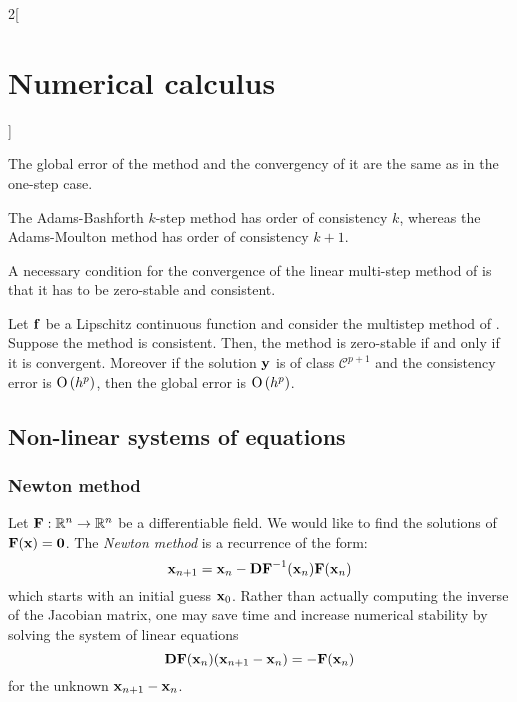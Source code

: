 \documentclass[../../../main_math.tex]{subfiles}
\begin{document}
\begin{multicols}{2}[\section{Numerical calculus}]
\begin{definition}
  \end{definition}
  \begin{remark}
    The global error of the method and the convergency of it are the same as in the one-step case.
  \end{remark}
  \begin{proposition}
    The Adams-Bashforth $k$-step method has order of consistency $k$, whereas the Adams-Moulton method has order of consistency $k+1$.
  \end{proposition}
  \begin{theorem}
    A necessary condition for the convergence of the linear multi-step method of  is that it has to be zero-stable and consistent.
  \end{theorem}
  \begin{theorem}
    Let $\boldsymbol{\mathrm{f}}$ be a Lipschitz continuous function and consider the multistep method of . Suppose the method is consistent. Then, the method is zero-stable if and only if it is convergent. Moreover if the solution $\boldsymbol{\mathrm{y}}$ is of class $\mathcal{C}^{p+1}$ and the consistency error is $\mathrm{O}\left(h^p\right)$, then the global error is $\mathrm{O}\left(h^{p}\right)$.
  \end{theorem}
  \subsection{Non-linear systems of equations}
  \subsubsection{Newton method}
  \begin{definition}
    Let $\boldsymbol{\mathrm{F}}:\mathbb{R}^n\rightarrow\mathbb{R}^n$ be a differentiable field. We would like to find the solutions of $\boldsymbol{\mathrm{F}}(\boldsymbol{\mathrm{x}})=\boldsymbol{\mathrm{0}}$.
    The \emph{Newton method} is a recurrence of the form:
    \begin{equation*}
      \boldsymbol{\mathrm{x}}_{n+1}=\boldsymbol{\mathrm{x}}_n-\boldsymbol{\mathrm{DF}}^{-1}(\boldsymbol{\mathrm{x}}_n)\boldsymbol{\mathrm{F}}(\boldsymbol{\mathrm{x}}_n)
    \end{equation*}
    which starts with an initial guess $\boldsymbol{\mathrm{x}}_0$.
    Rather than actually computing the inverse of the Jacobian matrix, one may save time and increase numerical stability by solving the system of linear equations
    $$
      \boldsymbol{\mathrm{DF}}(\boldsymbol{\mathrm{x}}_n)(\boldsymbol{\mathrm{x}}_{n+1}-\boldsymbol{\mathrm{x}}_n)=-\boldsymbol{\mathrm{F}}(\boldsymbol{\mathrm{x}}_n)
    $$
    for the unknown $\boldsymbol{\mathrm{x}}_{n+1}-\boldsymbol{\mathrm{x}}_n$.
  \end{definition}
\end{multicols}
\end{document}
